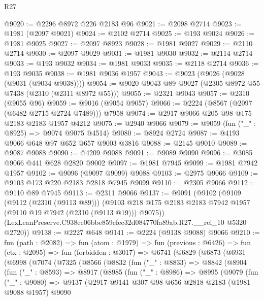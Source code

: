 \begin{lexlean}{R27}
\begin{coremodule}
@9020 := @2296 @8972 @226 @2183 @96
@9021 := @2098 @2714
@9023 := @1981 (@2097 @9021)
@9024 := @2102 @2714
@9025 := @193 @9024
@9026 := @1981 @9025
@9027 := @2097 @8923
@9028 := @1981 @9027
@9029 := @2110 @2714
@9030 := @2097 @9029
@9031 := @1981 @9030
@9032 := @2114 @2714
@9033 := @193 @9032
@9034 := @1981 @9033
@9035 := @2118 @2714
@9036 := @193 @9035
@9038 := @1981 @9036 @1957
@9043 := @9023 (@9026 (@9028 (@9031 (@9034 @9038))))
@9054 := @9020 @9043 @89 @9027 (@2305 @8972 @55 @7438 (@2310 (@2311 @8972 @55)))
@9055 := @2321 @9043
@9057 := @2310 (@9055 @96)
@9059 := @9016 (@9054 @9057)
@9066 := @2224 (@8567 (@2097 (@6482 @2715 @2724 @7489))) @7958
@9074 := @2917 @9066 @205 @98 @175 @2183 @2183 @1957 @4212
@9075 := @2940 @9066
@9079 := @9059 (fun ("_" : @8925) => @9074 @9075 @4514)
@9080 := @8924 @2724
@9087 := @4193 @9066 @648 @97 @652 @657 @9003 @3816
@9088 := @2145 @9010
@9089 := @9087 @9088
@9090 := @4209 @9088
@9091 := @9089 @9090
@9096 := @3085 @9066 @441 @628 @2820 @9002
@9097 := @1981 @7945
@9099 := @1981 @7942 @1957
@9102 := @9096 (@9097 @9099) @9088
@9103 := @2975 @9066
@9109 := @9103 @173 @220 @2183 @2818 @7945 @9099
@9110 := @2305 @9066
@9112 := @9110 @89 @7945
@9113 := @2311 @9066
@9137 := @9091
    (@9102
      (@9109
        (@9112 (@2310 (@9113 @89)))
        (@9103 @218 @175 @2183 @2183 @7942 @1957 (@9110 @19 @7942 (@2310 (@9113 @19))) @9075))
      (LexLeanPreserve.C938ec06bbe859efec32d084770fa89ab.R27.__rel_10 @5320 @2720))
@9138 := @2227 @648
@9141 := @2224 (@9138 @9088) @9066
@9210 := fun (path : @2082) =>
  fun (atom : @1979) =>
  fun (previous : @6426) =>
  fun (ctx : @2095) =>
  fun (forbidden : @3017) =>
  @6741
    (@6829
      (@6873
        (@6931
          (@6998
            (@7074
              (@7325
                (@8566
                  (@8832
                    (fun ("_" : @8833) =>
                    @8842
                      (@8904
                        (fun ("_" : @8593) =>
                        @8917
                          (@8985
                            (fun ("_" : @8986) =>
                            @8995
                              (@9079
                                (fun ("_" : @9080) =>
                                @9137
                                  (@2917
                                    @9141
                                    @307
                                    @98
                                    @656
                                    @2818
                                    @2183
                                    (@1981 @9088 @1957)
                                    @9090

\end{coremodule}
\end{lexlean}
